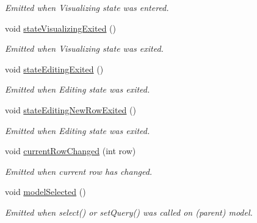 \begin{DoxyCompactItemize}
\begin{DoxyCompactList}\small\item\em Emitted when Visualizing state was entered. \end{DoxyCompactList}\item 
\hypertarget{classmdt_abstract_sql_widget_a8f2eda6e219e49c972834a1e5c39e8ff}{
void \hyperlink{classmdt_abstract_sql_widget_a8f2eda6e219e49c972834a1e5c39e8ff}{stateVisualizingExited} ()}
\label{classmdt_abstract_sql_widget_a8f2eda6e219e49c972834a1e5c39e8ff}

\begin{DoxyCompactList}\small\item\em Emitted when Visualizing state was exited. \end{DoxyCompactList}\item 
\hypertarget{classmdt_abstract_sql_widget_a925485d7acc131d438f6ea251c9b1fb9}{
void \hyperlink{classmdt_abstract_sql_widget_a925485d7acc131d438f6ea251c9b1fb9}{stateEditingExited} ()}
\label{classmdt_abstract_sql_widget_a925485d7acc131d438f6ea251c9b1fb9}

\begin{DoxyCompactList}\small\item\em Emitted when Editing state was exited. \end{DoxyCompactList}\item 
\hypertarget{classmdt_abstract_sql_widget_af4ed2a005f55ffe23ce6382f1ed3f68e}{
void \hyperlink{classmdt_abstract_sql_widget_af4ed2a005f55ffe23ce6382f1ed3f68e}{stateEditingNewRowExited} ()}
\label{classmdt_abstract_sql_widget_af4ed2a005f55ffe23ce6382f1ed3f68e}

\begin{DoxyCompactList}\small\item\em Emitted when Editing state was exited. \end{DoxyCompactList}\item 
void \hyperlink{classmdt_abstract_sql_widget_a182972cd54cf7e00322c0b6973ecbde2}{currentRowChanged} (int row)
\begin{DoxyCompactList}\small\item\em Emitted when current row has changed. \end{DoxyCompactList}\item 
void \hyperlink{classmdt_abstract_sql_widget_a6787c093d9b0b64a1e8d3794ba505604}{modelSelected} ()
\begin{DoxyCompactList}\small\item\em Emitted when select() or setQuery() was called on (parent) model. \end{DoxyCompactList}\end{DoxyCompactItemize}
